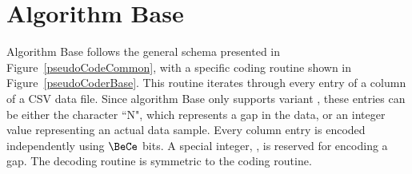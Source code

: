 

\vspace{-10pt}
\section{Algorithm Base}
\label{algo:base}
\newcommand{\codeColumn}{$\text{code\_column}$}
\newcommand{\decodeColumn}{$\text{decode\_column}$}

\vspace{-5pt}


Algorithm Base follows the general schema presented in Figure~\ref{pseudoCodeCommon}, with a specific coding routine shown in Figure~\ref{pseudoCoderBase}. This routine iterates through every entry of a column of a CSV data file. Since algorithm Base only supports variant \NOmaskalgo, these entries can be either the character ``N", which represents a gap in the data, or an integer value representing an actual data sample. Every column entry is encoded independently using $\BeCe$ bits. A special integer, \nodata, is reserved for encoding a gap. The decoding routine is symmetric to the coding routine.






